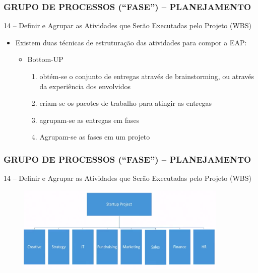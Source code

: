 \begin{frame}
 \frametitle{GRUPO DE PROCESSOS (“FASE”) – PLANEJAMENTO}
   14 – Definir e Agrupar as Atividades que Serão Executadas pelo Projeto (WBS)
  \begin{itemize}
   \item Existem duas técnicas de estruturação das atividades para compor a EAP:
   \begin{itemize}
    \item Bottom-UP
    \begin{enumerate}
     \item obtém-se o conjunto de entregas através de brainstorming, ou através da experiência dos envolvidos
     \item criam-se os pacotes de trabalho para atingir as entregas
     \item agrupam-se as entregas em fases
     \item Agrupam-se as fases em um projeto
    \end{enumerate}
   \end{itemize}
  \end{itemize}
\end{frame}




\begin{frame}
 \frametitle{GRUPO DE PROCESSOS (“FASE”) – PLANEJAMENTO}
 14 – Definir e Agrupar as Atividades que Serão Executadas pelo Projeto (WBS)
  \begin{figure}
   \centering
   \includegraphics[width = 0.9\textwidth]{figs/fig19.png}
  \end{figure}
\end{frame}

